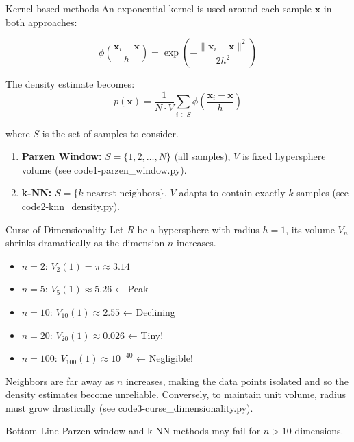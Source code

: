 \documentclass{beamer}
\newcommand{\x}{\mathbf{x}}
\begin{document}
\begin{frame}{Kernel-based methods}
An \alert{exponential kernel} is used around each sample $\x$ in both approaches:

$$\phi\left(\frac{\x_i-\x}{h}\right) = \exp\left(-\frac{\|\x_i-\x\|^2}{2h^2}\right)$$

The density estimate becomes:
$$p(\x) = \frac{1}{N\cdot V} \sum_{i \in S} \phi\left(\frac{\x_i-\x}{h}\right)$$

where $S$ is the set of samples to consider.

\begin{enumerate}
\item \textbf{Parzen Window:} $S = \{1, 2, \ldots, N\}$ (all samples), $V$ is fixed hypersphere volume  (see code1-parzen\_window.py). 
\item \textbf{k-NN:} $S = \{k \text{ nearest neighbors}\}$, $V$ adapts to contain exactly $k$ samples (see code2-knn\_density.py).
\end{enumerate}
\end{frame}

\begin{frame}{Curse of Dimensionality}
 Let $R$ be a hypersphere with radius $h=1$, its volume $V_n$ shrinks
 dramatically as the dimension $n$ increases.
\begin{itemize}
\item $n=2$: $V_2(1) = \pi \approx 3.14$ 
\item $n=5$: $V_5(1) \approx 5.26$ {\color{blue}← Peak}
\item $n=10$: $V_{10}(1) \approx 2.55$ {\color{orange}← Declining}
\item $n=20$: $V_{20}(1) \approx 0.026$ {\color{red}← Tiny!}
\item $n=100$: $V_{100}(1) \approx 10^{-40}$ {\color{red}← Negligible!}
\end{itemize}
Neighbors are \alert{far away} as $n$ increases, making the data
points \alert{isolated} and so the density estimates become
\alert{unreliable}. Conversely, to maintain unit volume, radius must
grow drastically (see code3-curse\_dimensionality.py).

\vspace{0.5cm} \pause

\begin{alertblock}{Bottom Line}
Parzen window and k-NN methods may fail for $n > 10$ dimensions.
\end{alertblock}

\end{frame}
\end{document}
